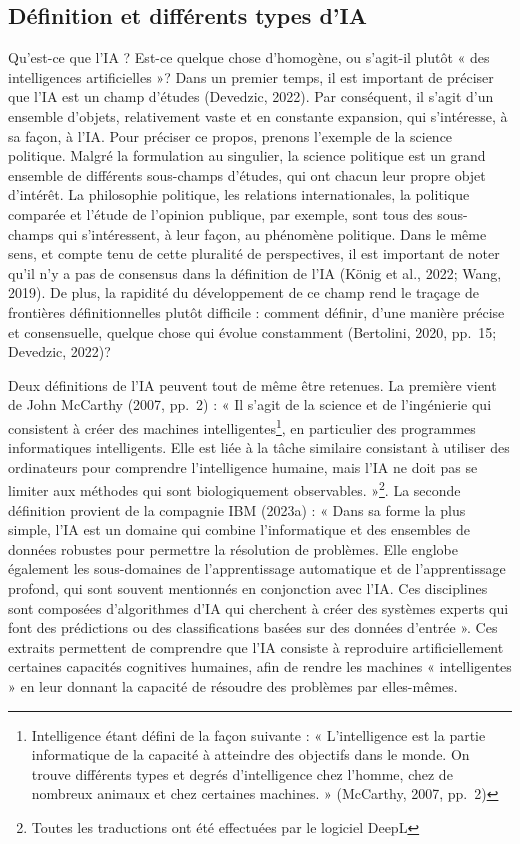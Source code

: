 \documentclass[
  letterpaper,
  DIV=11,
  numbers=noendperiod,
  oneside]{scrreprt}
\begin{document}
\hypertarget{duxe9finition-et-diffuxe9rents-types-dia}{%
\subsection{Définition et différents types
d'IA}\label{duxe9finition-et-diffuxe9rents-types-dia}}

Qu'est-ce que l'IA ? Est-ce quelque chose d'homogène, ou s'agit-il
plutôt « des intelligences artificielles »? Dans un premier temps, il
est important de préciser que l'IA est un champ d'études (Devedzic,
2022). Par conséquent, il s'agit d'un ensemble d'objets, relativement
vaste et en constante expansion, qui s'intéresse, à sa façon, à l'IA.
Pour préciser ce propos, prenons l'exemple de la science politique.
Malgré la formulation au singulier, la science politique est un grand
ensemble de différents sous-champs d'études, qui ont chacun leur propre
objet d'intérêt. La philosophie politique, les relations
internationales, la politique comparée et l'étude de l'opinion publique,
par exemple, sont tous des sous-champs qui s'intéressent, à leur façon,
au phénomène politique. Dans le même sens, et compte tenu de cette
pluralité de perspectives, il est important de noter qu'il n'y a pas de
consensus dans la définition de l'IA (König et al., 2022; Wang, 2019).
De plus, la rapidité du développement de ce champ rend le traçage de
frontières définitionnelles plutôt difficile : comment définir, d'une
manière précise et consensuelle, quelque chose qui évolue constamment
(Bertolini, 2020, pp.~15; Devedzic, 2022)?

Deux définitions de l'IA peuvent tout de même être retenues. La première
vient de John McCarthy (2007, pp.~2) : « Il s'agit de la science et de
l'ingénierie qui consistent à créer des machines
intelligentes\footnote{Intelligence étant défini de la façon suivante :
  « L'intelligence est la partie informatique de la capacité à atteindre
  des objectifs dans le monde. On trouve différents types et degrés
  d'intelligence chez l'homme, chez de nombreux animaux et chez
  certaines machines. » (McCarthy, 2007, pp.~2)}, en particulier des
programmes informatiques intelligents. Elle est liée à la tâche
similaire consistant à utiliser des ordinateurs pour comprendre
l'intelligence humaine, mais l'IA ne doit pas se limiter aux méthodes
qui sont biologiquement observables. »\footnote{Toutes les traductions
  ont été effectuées par le logiciel DeepL}. La seconde définition
provient de la compagnie IBM (2023a) : « Dans sa forme la plus simple,
l'IA est un domaine qui combine l'informatique et des ensembles de
données robustes pour permettre la résolution de problèmes. Elle englobe
également les sous-domaines de l'apprentissage automatique et de
l'apprentissage profond, qui sont souvent mentionnés en conjonction avec
l'IA. Ces disciplines sont composées d'algorithmes d'IA qui cherchent à
créer des systèmes experts qui font des prédictions ou des
classifications basées sur des données d'entrée ». Ces extraits
permettent de comprendre que l'IA consiste à reproduire artificiellement
certaines capacités cognitives humaines, afin de rendre les machines «
intelligentes » en leur donnant la capacité de résoudre des problèmes
par elles-mêmes.
\end{document}
